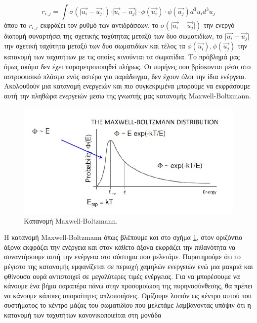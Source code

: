 \begin{equation}
\label{eq53}
r_{i,j}= \int \sigma( \vert \vec{u_{i}}- \vec{u_{j}} \vert) \cdot \vert \vec{u_{i}}- \vec{u_{j}} \vert \cdot \phi(\vec{u_{i}}) \cdot \phi(\vec{u_{j}})d^{3}u_{i}d^{3}u_{j}
\end{equation}
όπου το $r_{i,j}$ εκφράζει τον ρυθμό των αντιδράσεων, το $\sigma( \vert \vec{u_{i}}- \vec{u_{j}} \vert)$ την ενεργό διατομή συναρτήσει της σχετικής ταχύτητας μεταξύ των δυο σωματιδίων, το $\vert \vec{u_{i}}- \vec{u_{j}} \vert $ την σχετική ταχύτητα μεταξύ των δυο σωματιδίων και τέλος τα $\phi(\vec{u_{i}}), \phi(\vec{u_{j}})$ την κατανομή των ταχυτήτων με τις οποίες κινούνται τα σωματίδια.
Το πρόβλημά μας όμως ακόμα δεν έχει παραμετροποιηθεί πλήρως. Οι πυρήνες που βρίσκονται μέσα στο αστροφυσικό πλάσμα ενός αστέρα για παράδειγμα, δεν έχουν όλοι την ίδια ενέργεια. Ακολουθούν μια κατανομή ενεργειών και πιο συγκεκριμένα μπορούμε να εκφράσουμε αυτή την πληθώρα ενεργειών μεσω της γνωστής μας κατανομής Maxwell-Boltzmann.

\begin{figure}[h]
    \centering
    \includegraphics[scale=0.7]{Figures/mb.jpg} 
    \caption{Κατανομή Maxwell-Boltzmann.}
    \label{fig:apx:mb}
\end{figure} 
Η κατανομή Maxwell-Boltzmann όπως βλέπουμε και στο σχήμα \ref{fig:apx:mb}, στον οριζόντιο άξονα εκφράζει την ενέργεια και στον κάθετο άξονα εκφράζει την πιθανότητα να συναντήσουμε αυτή την ενέργεια στο σύστημα που μελετάμε. Παρατηρούμε ότι το μέγιστο της κατανομής εμφανίζεται σε περιοχή χαμηλών ενεργειών ενώ μια μακριά και φθίνουσα ουρά αντιστοιχεί σε μεγαλύτερες τιμές ενέργειας. Για να μπορέσουμε να κάνουμε ένα βήμα παραπέρα πάνω στην προσομοίωση της πυρηνοσύνθεσης, θα πρέπει να κάνουμε κάποιες απαραίτητες απλοποιήσεις. Ορίζουμε λοιπόν ως κέντρο αυτού του συστήματος το κέντρο μάζας του σωματιδίου που μελετάμε λαμβάνοντας υπόψιν ότι η κατανομή των ταχυτήτων κανονικοποιείται στη μονάδα

